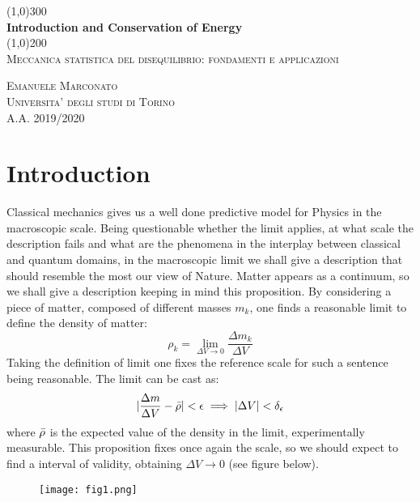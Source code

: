 \documentclass{article}
\begin{document}
\begin{titlepage}
	\begin{center}
	
	\line(1,0){300}\\
	[5mm]
	\huge{\bfseries Introduction and Conservation of Energy}\\
	[2mm]
	\line(1,0){200}\\
	[2cm]
	\textsc{\Large Meccanica statistica del disequilibrio: fondamenti e applicazioni} \\
	[8cm]
	
	\end{center}
	
	\begin{flushright}
	\textsc{\LARGE Emanuele Marconato}\\
	[0.5cm]
	\textsc{\large Universita' degli studi di Torino\\
	[0.5cm]
	A.A. 2019/2020 }
	\end{flushright}
	
\end{titlepage}

\newpage
\section{Introduction}
Classical mechanics gives us a well done predictive model for Physics in the macroscopic scale. Being questionable whether the limit applies, at what scale  the description fails and what are the phenomena in the interplay between classical and quantum domains, in the macroscopic limit we shall give a description that should resemble the most our view of Nature. Matter appears as a continuum, so we shall give a description keeping in mind this proposition. By considering a piece of matter, composed of different masses $m_k$, one finds a reasonable limit to define the density of matter:
$$\rho_k = \lim_{\Delta V \xrightarrow{} 0} \frac{\Delta m_k}{\Delta V}$$
Taking the definition of limit one fixes the reference scale for such a sentence being reasonable. The limit can be cast as:
$$ |\frac{\Delta m}{\Delta V} - \Bar{\rho}|<\epsilon \implies |\Delta V|< \delta_\epsilon$$
where $\Bar{\rho}$ is the expected value of the density in the limit, experimentally measurable. This proposition fixes once again the scale, so we should expect to find a interval of validity, obtaining ${\Delta V \xrightarrow{} 0} $ (see figure below).

\begin{figure*}[htp]
    \centering
    \texttt{[image: fig1.png]}
    \caption{}
    \label{fig:my_label}
\end{figure*}
\end{document}
